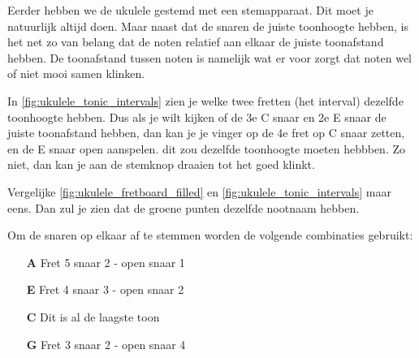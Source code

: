 \begin{minipage}{0.48\textwidth}
Eerder hebben we de ukulele gestemd met een stemapparaat. Dit moet je natuurlijk altijd doen. Maar naast dat de snaren de juiste toonhoogte hebben, is het net zo van belang dat de noten relatief aan elkaar de juiste toonafstand hebben. De toonafstand tussen noten is namelijk wat er voor zorgt dat noten wel of niet mooi samen klinken.

In \ref{fig:ukulele_tonic_intervals} zien je welke twee fretten (het interval) dezelfde toonhoogte hebben. Dus als je wilt kijken of de 3e C snaar en 2e E snaar de juiste toonafstand hebben, dan kan je je vinger op de 4e fret op C snaar zetten, en de E snaar open aanspelen. dit zou dezelfde toonhoogte moeten hebbben. Zo niet, dan kan je aan de stemknop draaien tot het goed klinkt.

Vergelijke \ref{fig:ukulele_fretboard_filled} en \ref{fig:ukulele_tonic_intervals} maar eens. Dan zul je zien dat de groene punten dezelfde nootnaam hebben.

Om de snaren op elkaar af te stemmen worden de volgende combinaties gebruikt:

\begin{itemize}
    \item[\textbf{A}] Fret 5 snaar 2 - open snaar 1
    \item[\textbf{E}] Fret 4 snaar 3 - open snaar 2
    \item[\textbf{C}] Dit is al de laagste toon
    \item[\textbf{G}] Fret 3 snaar 2 - open snaar 4
\end{itemize}

\end{minipage}
\hfill
